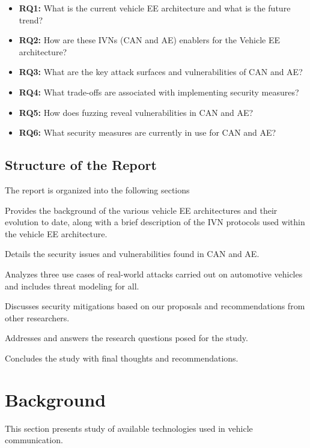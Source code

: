 \documentclass{report}
\begin{document}
\begin{itemize}
    \item \textbf{RQ1:} What is the current vehicle EE architecture and what is the future trend?
    \item \textbf{RQ2:} How are these IVNs (CAN and AE) enablers for the Vehicle EE architecture?
    \item \textbf{RQ3:} What are the key attack surfaces and vulnerabilities of CAN and AE?
    \item \textbf{RQ4:} What trade-offs are associated with implementing security measures?
    \item \textbf{RQ5:} How does fuzzing reveal vulnerabilities in CAN and AE?
    \item \textbf{RQ6:} What security measures are currently in use for CAN and AE?
\end{itemize}

\subsection{Structure of the Report}
The report is organized into the following sections

\begin{description}[leftmargin=!,labelwidth=\widthof{\bfseries Section 8:}]
    \item[Section 3:] Provides the background of the various vehicle EE architectures and their evolution to date, along with a brief description of the IVN protocols used within the vehicle EE architecture.
    \item[Section 4:] Details the security issues and vulnerabilities found in CAN and AE.
    \item[Section 5:] Analyzes three use cases of real-world attacks carried out on automotive vehicles and includes threat modeling for all.
    \item[Section 6:] Discusses security mitigations based on our proposals and recommendations from other researchers.
    \item[Section 7:] Addresses and answers the research questions posed for the study.
    \item[Section 8:] Concludes the study with final thoughts and recommendations.
\end{description}

\section{Background}
This section presents study of available technologies used in vehicle communication.
\end{document}

